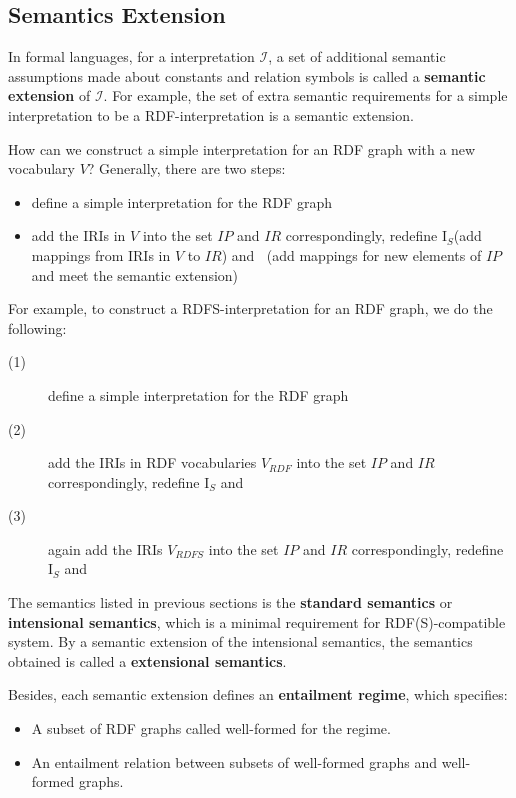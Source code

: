 \documentclass{article}
\DeclareMathOperator{\IEXT}{I_{EXT}}
\begin{document}
\subsection{Semantics Extension}
In formal languages, for a interpretation $\mathcal{I}$, a set of additional semantic assumptions made about constants and relation symbols is called a \textbf{semantic extension} of $\mathcal{I}$. For example, the set of extra semantic requirements for a simple interpretation to be a RDF-interpretation is a semantic extension.\newline

How can we construct a simple interpretation for an RDF graph with a new vocabulary $V$?
Generally, there are two steps:
\begin{itemize}
\item define a simple interpretation for the RDF graph
\item add the IRIs in $V$ into the set $IP$ and $IR$ correspondingly, redefine $\text{I}_S$(add mappings from IRIs in $V$ to $IR$) and $\IEXT$(add mappings for new elements of $IP$ and meet the semantic extension)
\end{itemize}
For example, to construct a RDFS-interpretation for an RDF graph, we do the following:
\begin{description}
\item[(1)]define a simple interpretation for the RDF graph
\item[(2)]add the IRIs in RDF vocabularies $V_{RDF}$ into the set $IP$ and $IR$ correspondingly, redefine $\text{I}_S$ and $\IEXT$
\item[(3)]again add the IRIs $V_{RDFS}$ into the set $IP$ and $IR$ correspondingly, redefine $\text{I}_S$ and $\IEXT$
\end{description}

 The semantics listed in previous sections is the \textbf{standard semantics} or \textbf{intensional semantics}, which is a minimal requirement for RDF(S)-compatible system. By a semantic extension of the intensional semantics, the semantics obtained is called a \textbf{extensional semantics}. \newline

 Besides, each semantic extension defines an \textbf{entailment regime}, which specifies:
\begin{itemize}
\item A subset of RDF graphs called well-formed for the regime.
\item An entailment relation between subsets of well-formed graphs and well-formed graphs.
\end{itemize}
\end{document}
